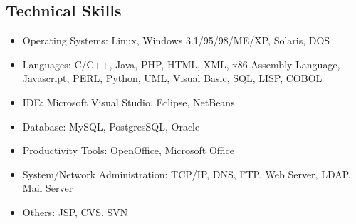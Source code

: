 \documentclass[overlapped,line,letterpaper]{res}
\begin{document}
\begin{resume}
%


\section{\bf Technical Skills}

\begin{itemize}
\item Operating Systems: Linux, Windows 3.1/95/98/ME/XP, Solaris, DOS
\item Languages: C/C++, Java, PHP, HTML, XML, x86 Assembly Language, Javascript, PERL, Python,
UML, Visual Basic, SQL, LISP, COBOL
\item IDE: Microsoft Visual Studio, Eclipse, NetBeans
\item Database: MySQL, PostgresSQL, Oracle
\item Productivity Tools: OpenOffice, Microsoft Office
\item System/Network Administration: TCP/IP, DNS, FTP, Web Server, LDAP, Mail Server
\item Others: JSP, CVS, SVN
\end{itemize}





\end{resume}
\end{document}
